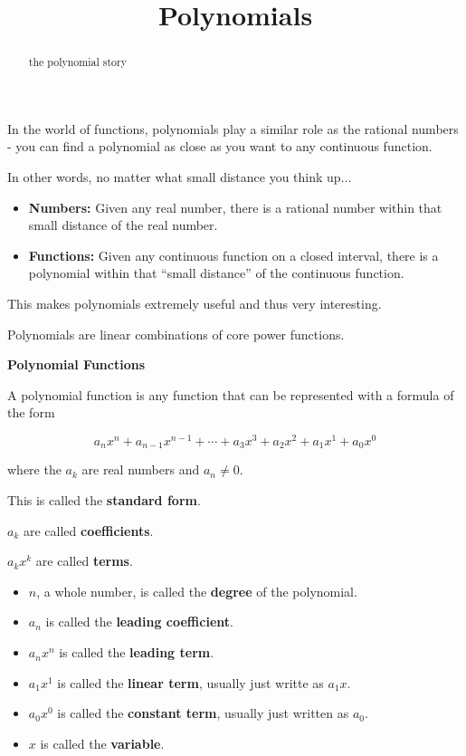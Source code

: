 \documentclass{ximera}
\title{Polynomials}
\begin{document}
\begin{abstract}
the polynomial story
\end{abstract}
\maketitle








In the world of functions, polynomials play a similar role as the rational numbers - you can find a polynomial as close as you want to any continuous function. 


In other words, no matter what small distance you think up...

\begin{itemize}
\item \textbf{Numbers:} Given any real number, there is a rational number within that small distance of the real number.

\item \textbf{Functions:} Given any continuous function on a closed interval, there is a polynomial within that ``small distance'' of the continuous function.
\end{itemize}

This makes polynomials extremely useful and thus very interesting. 

Polynomials are linear combinations of core power functions.


\begin{definition} \textbf{\textcolor{green!50!black}{Polynomial Functions}} 

A polynomial function is any function that can be represented with a formula of the form

\[    a_n x^n + a_{n-1} x^{n-1} + \cdots + a_3 x^3 + a_2 x^2 + a_1 x^1 + a_0 x^0      \]

where the $a_k$ are real numbers and $a_n \ne 0$.

This is called the \textbf{standard form}.

$a_k$ are called \textbf{coefficients}.

$a_k x^k$ are called \textbf{terms}.



\begin{itemize}
\item $n$, a whole number, is called the \textbf{degree} of the polynomial.
\item $a_n$ is called the \textbf{leading coefficient}.
\item $a_n x^n$ is called the \textbf{leading term}.
\item $a_1 x^1$ is called the \textbf{linear term}, usually just writte as $a_1 x$.
\item $a_0 x^0$ is called the \textbf{constant term}, usually just written as $a_0$.
\item $x$ is called the \textbf{variable}.
\end{itemize}


\end{definition}
\end{document}
